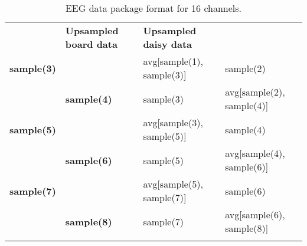 
\begin{table}[h]
\begin{centering}
\begin{tabular}{>{\centering}m{2cm}>{\centering}m{2cm}>{\raggedright}m{4cm}>{\raggedright}m{4cm}}
\toprule 
\addlinespace[1em]
\multicolumn{2}{c}{\textbf{Received}} & \textbf{Upsampled board data} & \textbf{Upsampled daisy data}\tabularnewline\addlinespace[1em]
\midrule
\addlinespace[1em]
\textbf{sample(3)} &  & avg{[}sample(1), sample(3){]} & sample(2)\tabularnewline
\addlinespace[0.5cm]
 & \textbf{sample(4)} & sample(3) & avg{[}sample(2), sample(4){]}\tabularnewline
\addlinespace[0.5cm]
\textbf{sample(5)} &  & avg{[}sample(3), sample(5){]} & sample(4)\tabularnewline
\addlinespace[0.5cm]
 & \textbf{sample(6)} & sample(5) & avg{[}sample(4), sample(6){]}\tabularnewline
\addlinespace[0.5cm]
\textbf{sample(7)} &  & avg{[}sample(5), sample(7){]} & sample(6)\tabularnewline
\addlinespace[0.5cm]
 & \textbf{sample(8)} & sample(7) & avg{[}sample(6), sample(8){]}\tabularnewline\addlinespace[1em]
\bottomrule
\addlinespace[0.5cm]
\end{tabular}
\par\end{centering}
\caption{EEG data package format for 16 channels.\label{table:eeg_data_package}}
\end{table}


